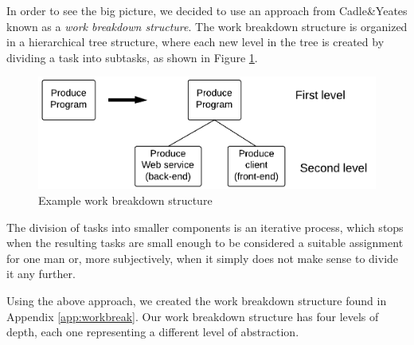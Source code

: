 In order to see the big picture, we decided to use an approach from Cadle\&Yeates\cite{caye} known as a \emph{work breakdown structure}. The work breakdown structure is organized in a hierarchical tree structure, where each new level in the tree is created by dividing a task into subtasks, as shown in Figure \ref{fig:breakdown}.

\begin{figure}[hbtp]
    \centering
	\includegraphics[scale=0.25]{./Empiri/Planning/img/wbslevels.png}
	\caption{Example work breakdown structure} \label{fig:breakdown}
\end{figure}

The division of tasks into smaller components is an iterative process, which stops when the resulting tasks are small enough to be considered a suitable assignment for one man or, more subjectively, when it simply does not make sense to divide it any further.

Using the above approach, we created the work breakdown structure found in Appendix \ref{app:workbreak}. Our work breakdown structure has four levels of depth, each one representing a different level of abstraction.